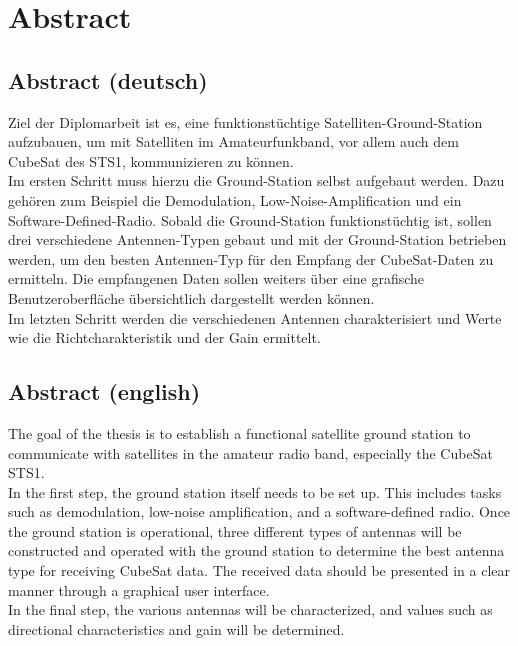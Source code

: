 \chapter*{Abstract}
\label{chap:abstr}
\vspace{-1cm}

\section*{Abstract (deutsch)}
\label{sec:abstr-de}
\vspace{-1cm}
Ziel der Diplomarbeit ist es, eine funktionstüchtige Satelliten-Ground-Station aufzubauen, um mit 
Satelliten im Amateurfunkband, vor allem auch dem CubeSat des STS1, kommunizieren zu können.\\
Im ersten Schritt muss hierzu die Ground-Station selbst aufgebaut werden. Dazu gehören zum 
Beispiel die Demodulation, Low-Noise-Amplification und ein Software-Defined-Radio. Sobald die 
Ground-Station funktionstüchtig ist, sollen drei verschiedene Antennen-Typen gebaut und mit der 
Ground-Station betrieben werden, um den besten Antennen-Typ für den Empfang der CubeSat-Daten zu ermitteln. Die empfangenen Daten sollen weiters über eine grafische Benutzeroberfläche 
übersichtlich dargestellt werden können.\\
Im letzten Schritt werden die verschiedenen Antennen charakterisiert und Werte wie die Richtcharakteristik und der Gain ermittelt.

\section*{Abstract (english)}
\label{sec:abstr-en}
\vspace{-1cm}
The goal of the thesis is to establish a functional satellite ground station to communicate with satellites in the amateur radio band, especially the CubeSat STS1.\\
In the first step, the ground station itself needs to be set up. This includes tasks such as demodulation, low-noise amplification, and a software-defined radio. Once the ground station is operational, three different types of antennas will be constructed and operated with the ground station to determine the best antenna type for receiving CubeSat data. The received data should be presented in a clear manner through a graphical user interface.\\
In the final step, the various antennas will be characterized, and values such as directional characteristics and gain will be determined.